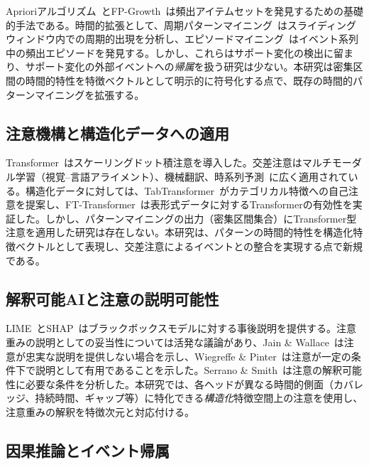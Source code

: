 \documentclass[sigconf,nonacm]{acmart}
\begin{document}
Aprioriアルゴリズム~\cite{agrawal1994fast}とFP-Growth~\cite{han2004mining}は頻出アイテムセットを発見するための基礎的手法である。時間的拡張として、周期パターンマイニング~\cite{tanbeer2009sliding}はスライディングウィンドウ内での周期的出現を分析し、エピソードマイニング~\cite{mannila1997discovery}はイベント系列中の頻出エピソードを発見する。しかし、これらはサポート変化の検出に留まり、サポート変化の外部イベントへの\emph{帰属}を扱う研究は少ない。本研究は密集区間の時間的特性を特徴ベクトルとして明示的に符号化する点で、既存の時間的パターンマイニングを拡張する。

\subsection{注意機構と構造化データへの適用}

Transformer~\cite{vaswani2017attention}はスケーリングドット積注意を導入した。交差注意はマルチモーダル学習（視覚--言語アライメント）、機械翻訳、時系列予測~\cite{li2019enhancing,zeng2023transformers}に広く適用されている。構造化データに対しては、TabTransformer~\cite{huang2020tabtransformer}がカテゴリカル特徴への自己注意を提案し、FT-Transformer~\cite{gorishniy2021revisiting}は表形式データに対するTransformerの有効性を実証した。しかし、パターンマイニングの出力（密集区間集合）にTransformer型注意を適用した研究は存在しない。本研究は、パターンの時間的特性を構造化特徴ベクトルとして表現し、交差注意によるイベントとの整合を実現する点で新規である。

\subsection{解釈可能AIと注意の説明可能性}

LIME~\cite{ribeiro2016why}とSHAP~\cite{lundberg2017unified}はブラックボックスモデルに対する事後説明を提供する。注意重みの説明としての妥当性については活発な議論があり、Jain \& Wallace~\cite{jain2019attention}は注意が忠実な説明を提供しない場合を示し、Wiegreffe \& Pinter~\cite{wiegreffe2019attention}は注意が一定の条件下で説明として有用であることを示した。Serrano \& Smith~\cite{serrano2019attention}は注意の解釈可能性に必要な条件を分析した。本研究では、各ヘッドが異なる時間的側面（カバレッジ、持続時間、ギャップ等）に特化できる\emph{構造化}特徴空間上の注意を使用し、注意重みの解釈を特徴次元と対応付ける。

\subsection{因果推論とイベント帰属}
\end{document}
